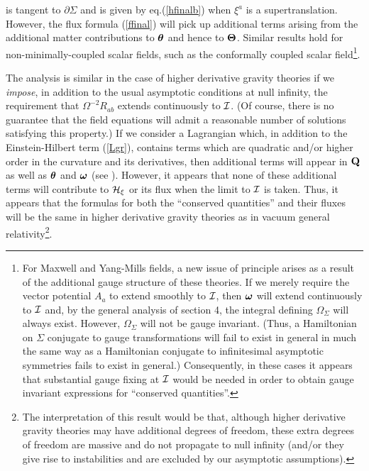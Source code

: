 is tangent to $\partial \Sigma$ and is given by eq.(\ref{hfinalb})
when $\xi^a$ is a supertranslation. However, the flux formula
(\ref{ffinal}) will pick up additional terms arising from the
additional matter contributions to ${\mbox{\boldmath $\theta$}}$ and
hence to ${\mbox{\boldmath $\Theta$}}$. Similar results hold for
non-minimally-coupled scalar fields, such as the conformally coupled
scalar field\footnote{For Maxwell and Yang-Mills fields, a new issue
of principle arises as a result of the additional gauge structure of
these theories. If we merely require the vector potential $A_a$ to
extend smoothly to $\cal I$, then ${\mbox{\boldmath $\omega$}}$ will
extend continuously to $\cal I$ and, by the general analysis of
section 4, the integral defining $\Omega_\Sigma$ will always
exist. However, $\Omega_\Sigma$ will not be gauge invariant. (Thus, a
Hamiltonian on $\Sigma$ conjugate to gauge transformations will fail
to exist in general in much the same way as a Hamiltonian conjugate to
infinitesimal asymptotic symmetries fails to exist in general.)
Consequently, in these cases it appears that substantial gauge fixing
at $\cal I$ would be needed in order to obtain gauge invariant
expressions for ``conserved quantities''.}.

The analysis is similar in the case of higher derivative gravity
theories if we {\it impose}, in addition to the usual asymptotic
conditions at null infinity, the requirement that $\Omega^{-2} R_{ab}$
extends continuously to $\cal I$. (Of course, there is no guarantee
that the field equations will admit a reasonable number of solutions
satisfying this property.) If we consider a Lagrangian which, in
addition to the Einstein-Hilbert term (\ref{Lgr}), contains terms
which are quadratic and/or higher order in the curvature and its
derivatives, then additional terms will appear in ${\bf Q}$ as well as
${\mbox{\boldmath $\theta$}}$ and ${\mbox{\boldmath $\omega$}}$ (see
\cite{iw}). However, it appears that none of these additional terms
will contribute to ${\cal H}_\xi$ or its flux when the limit to $\cal
I$ is taken. Thus, it appears that the formulas for both the
``conserved quantities'' and their fluxes will be the same in higher
derivative gravity theories as in vacuum general
relativity\footnote{The interpretation of this result would be that,
although higher derivative gravity theories may have additional
degrees of freedom, these extra degrees of freedom are massive and do
not propagate to null infinity (and/or they give rise to instabilities
and are excluded by our asymptotic assumptions).}.

